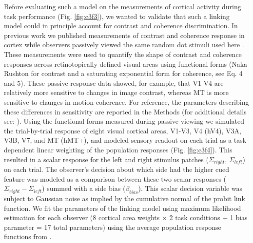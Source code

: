 Before evaluating such a model on the measurements of cortical activity during task performance (Fig. \ref{fig:c3f3}), we wanted to validate that such a linking model could in principle account for contrast and coherence discrimination. In previous work we published measurements of contrast and coherence response in cortex while observers passively viewed the same random dot stimuli used here \citep{Birman2018-sp}. These measurements were used to quantify the shape of contrast and coherence responses across retinotopically defined visual areas using functional forms (Naka-Rushton for contrast and a saturating exponential form for coherence, see Eq. 4 and 5). These passive-response data showed, for example, that V1-V4 are relatively more sensitive to changes in image contrast, whereas MT is more sensitive to changes in motion coherence. For reference, the parameters describing these differences in sensitivity are reported in the Methods (for additional details see: \citet{Birman2018-sp}). Using the functional forms measured during passive viewing we simulated the trial-by-trial response of eight visual cortical areas, V1-V3, V4 (hV4), V3A, V3B, V7, and MT (hMT+), and modeled sensory readout on each trial as a task-dependent linear weighting of the population responses (Fig. \ref{fig:c3f4}). This resulted in a scalar response for the left and right stimulus patches ($\Sigma_{right}$, $\Sigma_{left}$) on each trial. The observer’s decision about which side had the higher cued feature was modeled as a comparison between these two scalar responses ($\Sigma_{right}-\Sigma_{left}$) summed with a side bias ($\beta_{bias}$). This scalar decision variable was subject to Gaussian noise as implied by the cumulative normal of the probit link function. We fit the parameters of the linking model using maximum likelihood estimation for each observer (8 cortical area weights $\times$ 2 task conditions + 1 bias parameter = 17 total parameters) using the average population response functions from \citet{Birman2018-sp}. 

